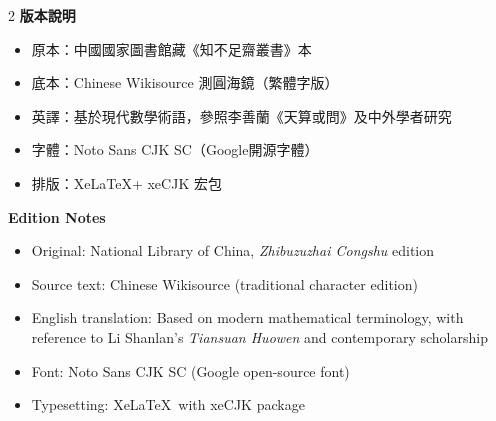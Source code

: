 \documentclass[11pt,a4paper]{article}
\newcommand{\cnpar}[1]{{\tradfont #1\par}}
\newcommand{\enpar}[1]{{\itshape #1\par}}
\begin{document}
\vspace{0.5cm}

\begin{paracol}{2}
\noindent\textbf{版本說明}

\cnpar{%
\begin{itemize}[leftmargin=2em]
  \item 原本：中國國家圖書館藏《知不足齋叢書》本
  \item 底本：Chinese Wikisource 測圓海鏡（繁體字版）
  \item 英譯：基於現代數學術語，參照李善蘭《天算或問》及中外學者研究
  \item 字體：Noto Sans CJK SC（Google開源字體）
  \item 排版：Xe\LaTeX + xeCJK 宏包
\end{itemize}}

\switchcolumn

\noindent\textbf{Edition Notes}

\enpar{%
\begin{itemize}[leftmargin=2em]
  \item Original: National Library of China, \textit{Zhibuzuzhai Congshu} edition
  \item Source text: Chinese Wikisource (traditional character edition)
  \item English translation: Based on modern mathematical terminology, with reference to Li Shanlan's \textit{Tiansuan Huowen} and contemporary scholarship
  \item Font: Noto Sans CJK SC (Google open-source font)
  \item Typesetting: Xe\LaTeX\ with xeCJK package
\end{itemize}}

\end{paracol}

\vspace{0.5cm}
\end{document}

